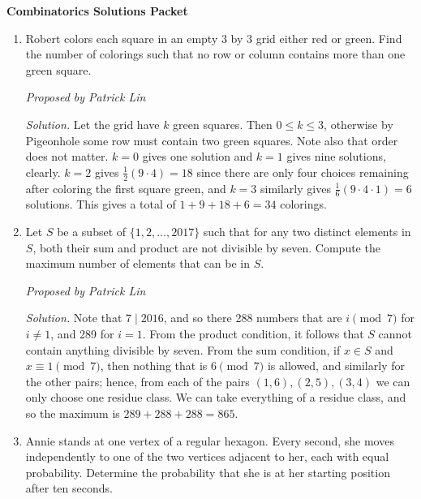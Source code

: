 \documentclass[10pt]{article}
\newcounter{enum}
\newcommand{\proposed}[1]
{
\vspace{5pt}
\noindent\textit{Proposed by #1}
}
\newcommand{\solution}
{
\vspace{5pt}
\noindent\textit{Solution.}\qquad
}
\begin{document}
\begin{center}
\huge\textbf{Combinatorics Solutions Packet}\normalsize

\vspace{3pt}
\end{center}

\begin{enumerate}

\item Robert colors each square in an empty 3 by 3 grid either red or green. Find the number of colorings such that no row or column contains more than one green square.

\proposed{Patrick Lin}

\solution Let the grid have $k$ green squares. Then $0 \le k \le 3$, otherwise by Pigeonhole some row must contain two green squares. Note also that order does not matter. $k = 0$ gives one solution and $k = 1$ gives nine solutions, clearly. $k = 2$ gives $\frac12(9\cdot4) = 18$ since there are only four choices remaining after coloring the first square green, and $k = 3$ similarly gives $\frac16(9\cdot4\cdot1) = 6$ solutions. This gives a total of $1+9+18+6 = \boxed{34}$ colorings.





\item Let $S$ be a subset of $\{1,2,\dots,2017\}$ such that for any two distinct elements in $S$, both their sum and product are not divisible by seven. Compute the maximum number of elements that can be in $S$.

\proposed{Patrick Lin}

\solution Note that $7 \mid 2016$, and so there 288 numbers that are $i \pmod 7$ for $i \neq 1$, and 289 for $i = 1$. From the product condition, it follows that $S$ cannot contain anything divisible by seven. From the sum condition, if $x \in S$ and $x \equiv 1 \pmod 7$, then nothing that is $6 \pmod 7$ is allowed, and similarly for the other pairs; hence, from each of the pairs $(1,6),(2,5),(3,4)$ we can only choose one residue class. We can take everything of a residue class, and so the maximum is $289 + 288 + 288 = \boxed{865}$.






\item Annie stands at one vertex of a regular hexagon. Every second, she moves independently to one of the two vertices adjacent to her, each with equal probability. Determine the probability that she is at her starting position after ten seconds.


\end{enumerate}
\end{document}
